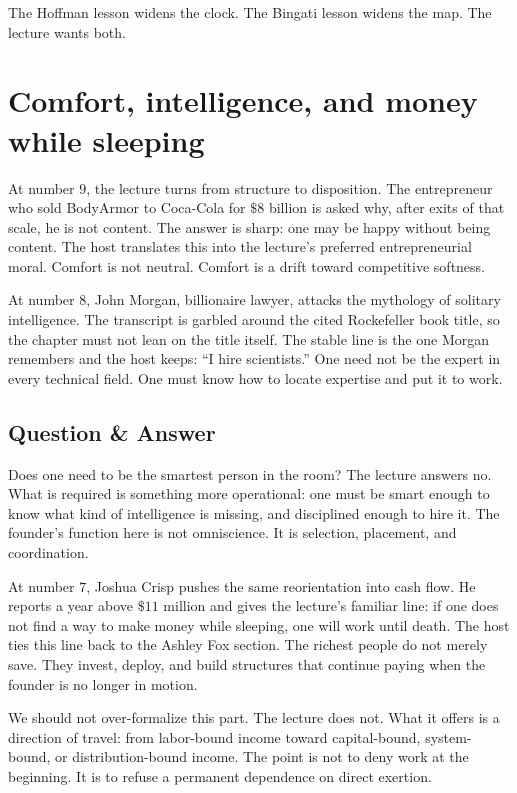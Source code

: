 The Hoffman lesson widens the clock. The Bingati lesson widens the map. The lecture wants both.

\section{Comfort, intelligence, and money while sleeping}

At number \(9\), the lecture turns from structure to disposition. The entrepreneur who sold BodyArmor to Coca-Cola for \(\$8\) billion is asked why, after exits of that scale, he is not content. The answer is sharp: one may be happy without being content. The host translates this into the lecture's preferred entrepreneurial moral. Comfort is not neutral. Comfort is a drift toward competitive softness.

At number \(8\), John Morgan, billionaire lawyer, attacks the mythology of solitary intelligence. The transcript is garbled around the cited Rockefeller book title, so the chapter must not lean on the title itself. The stable line is the one Morgan remembers and the host keeps: ``I hire scientists.'' One need not be the expert in every technical field. One must know how to locate expertise and put it to work.

\subsection{Question \& Answer}

Does one need to be the smartest person in the room? The lecture answers no. What is required is something more operational: one must be smart enough to know what kind of intelligence is missing, and disciplined enough to hire it. The founder's function here is not omniscience. It is selection, placement, and coordination.

At number \(7\), Joshua Crisp pushes the same reorientation into cash flow. He reports a year above \(\$11\) million and gives the lecture's familiar line: if one does not find a way to make money while sleeping, one will work until death. The host ties this line back to the Ashley Fox section. The richest people do not merely save. They invest, deploy, and build structures that continue paying when the founder is no longer in motion.

We should not over-formalize this part. The lecture does not. What it offers is a direction of travel: from labor-bound income toward capital-bound, system-bound, or distribution-bound income. The point is not to deny work at the beginning. It is to refuse a permanent dependence on direct exertion.

